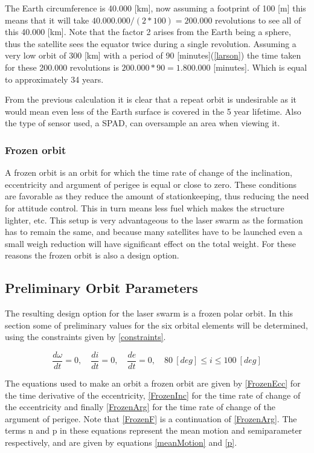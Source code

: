 The Earth circumference is 40.000 [km], now assuming a footprint of 100 [m] this means that it will take $40.000.000/(2*100)=200.000$ revolutions to see all of this 40.000 [km]. Note that the factor 2 arises from the Earth being a sphere, thus the satellite sees the equator twice during a single revolution. Assuming a very low orbit of 300 [km] with a period of 90 [minutes](\ref{larson}) the time taken for these 200.000 revolutions is $200.000*90=1.800.000$ [minutes]. Which is equal to approximately 34 years.

From the previous calculation it is clear that a repeat orbit is undesirable as it would mean even less of the Earth surface is covered in the 5 year lifetime. Also the type of sensor used, a \ac{SPAD}, can oversample an area when viewing it.

\subsubsection{Frozen orbit}
A frozen orbit is an orbit for which the time rate of change of the inclination, eccentricity and argument of perigee is equal or close to zero. These conditions are favorable as they reduce the amount of stationkeeping, thus reducing the need for attitude control. This in turn means less fuel which makes the structure lighter, etc.
This setup is very advantageous to the laser swarm as the formation has to remain the same, and because many satellites have to be launched even a small weigh reduction will have significant effect on the total weight. For these reasons the frozen orbit is also a design option.

\subsection{Preliminary Orbit Parameters}
The resulting design option for the laser swarm is a frozen polar orbit. In this section some of preliminary values for the six orbital elements will be determined, using the constraints given by \ref{constraints}.

\begin{equation}
\frac{{d\omega }}{{dt}} = 0,\quad \frac{{di }}{{dt}} = 0,\quad \frac{{de }}{{dt}} = 0,\quad 80\ [deg] \leq i \leq 100\ [deg]
\label{constraints}
\end{equation}

The equations used to make an orbit a frozen orbit are given by \ref{FrozenEcc} for the time derivative of the eccentricity, \ref{FrozenInc} for the time rate of change of the eccentricity and finally \ref{FrozenArg} for the time rate of change of the argument of perigee. Note that \ref{FrozenF} is a continuation of \ref{FrozenArg}. The terms n and p in these equations represent the mean motion and semiparameter respectively, and are given by equations \ref{meanMotion} and \ref{p}.

